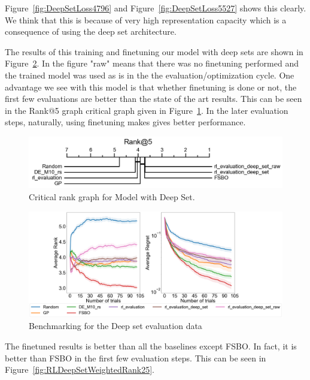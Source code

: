\documentclass[12pt, twoside, ngerman]{report}
\begin{document}
Figure~\ref{fig:DeepSetLoss4796} and Figure~\ref{fig:DeepSetLoss5527} shows this clearly.
We think that this is because of very high representation capacity which is a consequence of using the deep set architecture.

The results of this training and finetuning our model with deep sets are shown in Figure~\ref{fig:RLDeepSetevaluation}.
In the figure "raw" means that there was no finetuning performed and the trained model was used as is in the the evaluation/optimization cycle.
One advantage we see with this model is that whether finetuning is done or not,  the first few evaluations are better than the state of the art results.
This can be seen in the Rank@5 graph critical graph given in Figure~\ref{fig:DeepSetRank5}.
In the later evaluation steps, naturally,  using finetuning makes gives better performance.

\begin{figure}[h]
  \centering
    \includegraphics[scale=0.35]{images/DeepSetRank5}
    \caption{Critical rank graph for Model with Deep Set.}
    \label{fig:DeepSetRank5}
\end{figure}

\begin{figure}[h]
  \centering
    \includegraphics[scale=0.20]{images/RLDeepSetevaluation}
    \caption{Benchmarking for the Deep set evaluation data}
    \label{fig:RLDeepSetevaluation}
\end{figure}
\fi

\iffalse
The finetuned results is better than all the baselines except FSBO.
In fact,  it is better than FSBO in the first few evaluation steps.
This can be seen in Figure~\ref{fig:RLDeepSetWeightedRank25}.
\end{document}
